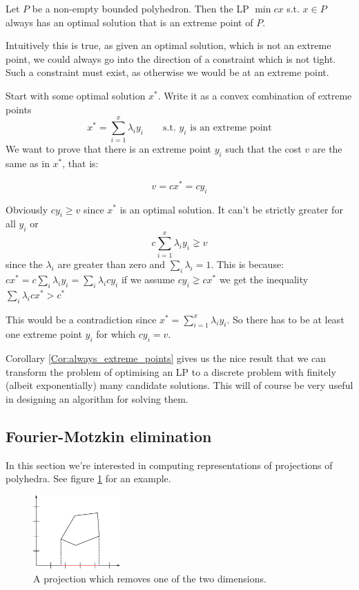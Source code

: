 \begin{cor}\label{Cor:always_extreme_points} Let $P$ be a non-empty bounded polyhedron. Then the LP $\min cx$ s.t. $x\in P$ always has an optimal solution that is an extreme point of $P$.
\end{cor}

Intuitively this is true, as given an optimal solution, which is not an extreme point, we could always go into the direction of a constraint which is not tight. Such a constraint must exist, as otherwise we would be at an extreme point. 

\begin{pr} %
Start with some optimal solution $x^*$. Write it as a convex combination of extreme points 
\[x^* = \sum_{i=1}^x \lambda_i y_i \qquad \text{s.t. } y_i \text{ is an extreme point}\]
We want to prove that there is an extreme point $y_i$ such that the cost $v$ are the same as in $x^{*}$, that is:

\[v = cx^* = cy_i\]

Obviously $cy_i\geq v$ since $x^*$ is an optimal solution. It can't be strictly greater for all $y_i$ or 
\[c\sum_{i=1}^x \lambda_i y_i \gneq v\]
since the $\lambda_i$ are greater than zero and $\sum_i \lambda_i =1$. This is because: $cx^* = c\sum_{i} \lambda_i y_i =\sum_i \lambda_i cy_i$ if we assume $cy_i\gneq cx^*$ we get the inequality $\sum_i \lambda_i cx^*> c^* $

This would be a contradiction since $x^*=\sum_{i=1}^x \lambda_i y_i$. So there has to be at least one extreme point $y_i$ for which $cy_i=v$.
\end{pr}

Corollary \ref{Cor:always_extreme_points} gives us the nice result that we can transform the problem of optimising an LP to a discrete problem with finitely (albeit exponentially) many candidate solutions. This will of course be very useful in designing an algorithm for solving them.

\subsection*{Fourier-Motzkin elimination}

In this section we're interested in computing representations of projections of polyhedra. See figure \ref{Fig:polyhedron_proj} for an example.

\begin{figure}[hbt]
\begin{center}
\includegraphics[width=0.3\textwidth]{./images/polyhedron_proj.pdf}
\end{center}
\caption{A projection which removes one of the two dimensions.}
\label{Fig:polyhedron_proj}
\end{figure}


